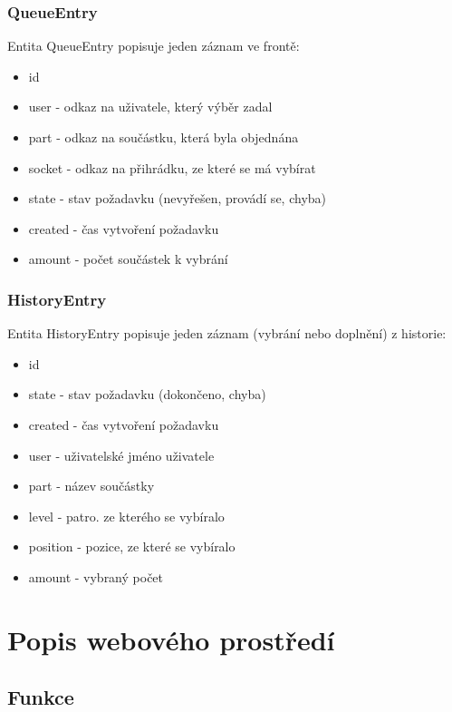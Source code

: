 \documentclass[12pt, a4paper, oneside]{article}
\begin{document}
\subsubsection{QueueEntry}

Entita QueueEntry popisuje jeden záznam ve frontě:
\begin{itemize}
\item id
\item user - odkaz na uživatele, který výběr zadal
\item part - odkaz na součástku, která byla objednána
\item socket - odkaz na přihrádku, ze které se má vybírat
\item state - stav požadavku (nevyřešen, provádí se, chyba)
\item created - čas vytvoření požadavku
\item amount - počet součástek k vybrání
\end{itemize}



\subsubsection{HistoryEntry}

Entita HistoryEntry popisuje jeden záznam (vybrání nebo doplnění) z historie:
\begin{itemize}
\item id
\item state - stav požadavku (dokončeno, chyba)
\item created - čas vytvoření požadavku
\item user - uživatelské jméno uživatele
\item part - název součástky
\item level - patro. ze kterého se vybíralo
\item position - pozice, ze které se vybíralo
\item amount - vybraný počet
\end{itemize}


\section{Popis webového prostředí}  %

\subsection{Funkce}
\end{document}

